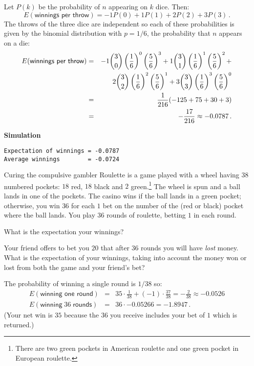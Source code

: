 \solution{}

Let $P(k)$ be the probability of $n$ appearing on $k$ dice. Then:
\[
E(\textsf{winnings per throw})=-1 P(0) + 1 P(1) + 2 P(2) + 3 P(3)\,.
\]
The throws of the three dice are independent so each of these probabilities is given by the binomial distribution with $p=1/6$, the probability that $n$ appears on a die:
\begin{eqnarray*}
E(\textsf{winnings per throw}) &=& 
-1 \displaystyle{3 \choose 0}\left(\frac{1}{6}\right)^0\left(\frac{5}{6}\right)^3
+1\displaystyle{3 \choose 1}\left(\frac{1}{6}\right)^1\left(\frac{5}{6}\right)^2+\\
&&2{3\choose 2}\left(\frac{1}{6}\right)^2\left(\frac{5}{6}\right)^1+
3\displaystyle{3 \choose 3}\left(\frac{1}{6}\right)^3\left(\frac{5}{6}\right)^0\\
&=& \frac{1}{216}(-125+75+30+3)\\
&=&-\frac{17}{216}\approx -0.0787\,.
\end{eqnarray*}

\textbf{Simulation}
\begin{verbatim}
Expectation of winnings = -0.0787
Average winnings        = -0.0724
\end{verbatim}


\begin{prob}{Curing the compulsive gambler}
Roulette is a game played with a wheel having $38$ numbered pockets: $18$ red, $18$ black and $2$ green.\footnote{There are two green pockets in American roulette and one green pocket in European roulette.} The wheel is spun and a ball lands in one of the pockets. The casino wins if the ball lands in a green pocket; otherwise, you win $36$ for each $1$ bet on the number of the (red or black) pocket where the ball lands. You play $36$ rounds of roulette,  betting $1$ in each round.

 What is the expectation your winnings?

 Your friend offers to bet you $20$ that after $36$ rounds you will have \emph{lost} money. What is the expectation of your winnings, taking into account the money won or lost from both the game and your friend's bet?
\end{prob}

\solution{}

 The probability of winning a single round is $1/38$ so:
\begin{eqnarray*}
E(\textsf{winning one round})&=&35\cdot \frac{1}{38} + (-1)\cdot\frac{37}{38} = -\frac{2}{38} \approx -0.0526\\
E(\textsf{winning}\;36\;\textsf{rounds})&=&36\cdot -0.05266=-1.8947\,.
\end{eqnarray*}
(Your net win is $35$ because the $36$ you receive includes your bet of $1$ which is returned.)

